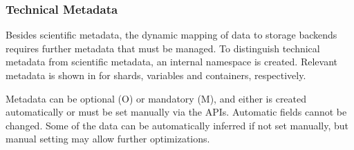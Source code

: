 

















\subsubsection{Technical Metadata}
\label{subsec: technical metadata}

Besides scientific metadata, the dynamic mapping of data to storage backends requires further metadata that must be managed.
To distinguish technical metadata from scientific metadata, an internal namespace is created.
Relevant metadata is shown in  for shards, variables and containers, respectively.

Metadata can be optional (O) or mandatory (M), and either is created automatically or must be set manually via the APIs.
Automatic fields cannot be changed.
Some of the data can be automatically inferred if not set manually, but manual setting may allow further optimizations.

